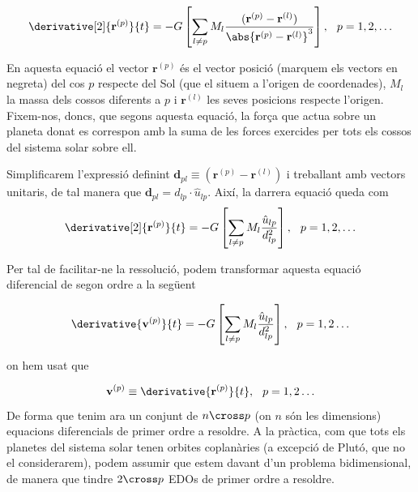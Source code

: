 \documentclass[10pt, twoside, a4paper]{article}
\begin{document}
\begin{equation}
    \derivative[2]{\mathbf{r}^{(p)}}{t} = - G \left[ \sum_{l \neq p} M_l \frac{(\mathbf{r}^{(p)}-\mathbf{r}^{(l)})}{\abs{\mathbf{r}^{(p)} - \mathbf{r}^{(l)}}^3}\right], \hspace{0.25cm} p = 1, 2, \ldots 
\end{equation}

En aquesta equació el vector $\mathbf{r}^{(p)}$ és el vector posició (marquem els vectors en negreta) del cos $p$ respecte del Sol (que el situem a l'origen de coordenades), $M_l$ la massa dels cossos diferents a $p$ i $\mathbf{r}^{(l)}$ les seves posicions respecte l'origen. Fixem-nos, doncs, que segons aquesta equació, la força que actua sobre un planeta donat es correspon amb la suma de les forces exercides per tots els cossos del sistema solar sobre ell. 

Simplificarem l'expressió definint $\mathbf{d}_{pl} \equiv (\mathbf{r}^{(p)}-\mathbf{r}^{(l)})$ i treballant amb vectors unitaris, de tal manera que $\mathbf{d}_{pl} = d_{lp}\cdot \hat{u}_{lp}$. Així, la darrera equació queda com
\begin{equation}
    \derivative[2]{\mathbf{r}^{(p)}}{t} = - G \left[ \sum_{l \neq p} M_l \frac{\hat{u}_{lp}}{d_{lp}^2}\right], \hspace{0.25cm} p = 1, 2, \ldots 
\end{equation}

Per tal de facilitar-ne la ressolució, podem transformar aquesta equació diferencial de segon ordre a la següent

\begin{equation}
    \derivative{\mathbf{v}^{(p)}}{t} = -G \left[ \sum_{l \neq p} M_l\frac{\hat{u}_{lp}}{d_{lp}^2} \right], \hspace{0.25cm} p = 1,2 \ldots \label{2}
\end{equation}

on hem usat que

\begin{equation}
    \mathbf{v}^{(p)} \equiv \derivative{\mathbf{r}^{(p)}}{t}, \hspace{0.25cm} p = 1,2 \ldots
\end{equation}
De forma que tenim ara un conjunt de $n \cross p$ (on $n$ són les dimensions) equacions diferencials de primer ordre a resoldre. A la pràctica, com que tots els planetes del sistema solar tenen orbites coplanàries (a excepció de Plutó, que no el considerarem), podem assumir que estem davant d'un problema bidimensional, de manera que tindre $2 \cross p$ EDOs de primer ordre a resoldre.
\end{document}
